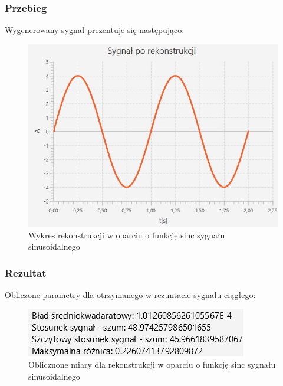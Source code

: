 \documentclass[12pt]{article}
\begin{document}
\subsubsection{Przebieg}
Wygenerowany sygnał prezentuje się następująco:
\begin{figure}[H]
	\centering
	\includegraphics[width=\linewidth]{sygnal_sinc.jpg}
	\caption{Wykres rekonstrukcji w oparciu o funkcję sinc sygnału sinusoidalnego}
	\label{wykres dla eksperymentu 5}
\end{figure}



\subsubsection{Rezultat}
Obliczone parametry dla otrzymanego w rezuntacie sygnału ciągłego:
\begin{figure}[H]
	\centering
	\includegraphics[width=\linewidth]{wyniki_sinc.jpg}
	\caption{Oblicznone miary dla rekonstrukcji w oparciu o funkcję sinc sygnału sinusoidalnego}
	\label{wartości dla eksperymentu 5}
\end{figure}
\end{document}
